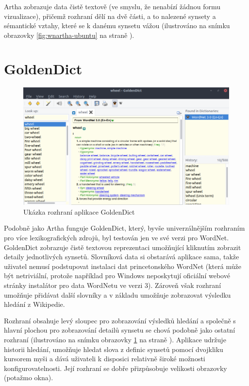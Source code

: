 \documentclass[a4paper, 11pt, oneside]{book}
\begin{document}
				Artha zobrazuje data čistě textově (ve smyslu, že nenabízí žádnou formu vizualizace), přičemž rozhraní dělí na dvě části, a to nalezené synsety a sémantické vztahy, které se k danému synsetu vážou (ilustrováno na snímku obrazovky \ref{fig:wnartha-ubuntu} na straně \pageref{fig:wnartha-ubuntu}). 

			\section{GoldenDict}
 		
 				\begin{figure}[h]
					\centering
					\includegraphics[width=1.0\textwidth]{wngoldendick-ubuntu.png}
					\caption{Ukázka rozhraní aplikace GoldenDict}
					\label{fig:wngoldendick-ubuntu}
				\end{figure}

				Podobně jako Artha funguje GoldenDict, který, byvše univerzálnějším rozhraním pro více lexikografických zdrojů, byl testován jen ve své verzi pro WordNet. GoldenDict zobrazuje čistě textovou reprezentaci umožňující kliknutím zobrazit detaily jednotlivých synsetů. Slovníková data si obstarává aplikace sama, takže uživatel nemusí podstupovat instalaci dat princetonského WordNet (která může být netriviální, protože například pro Windows neposkytují oficiální webové stránky instalátor pro data WordNetu ve verzi 3). Zároveň však rozhraní umožňuje přidávat další slovníky a v základu umožňuje zobrazovat výsledku hledání z Wikipedie. 

				Rozhraní obsahuje levý sloupec pro zobrazování výsledků hledání a společně s hlavní plochou pro zobrazování detailů synsetu se chová podobně jako ostatní rozhraní (ilustrováno na snímku obrazovky \ref{fig:wngoldendick-ubuntu} na straně \pageref{fig:wngoldendick-ubuntu}). Aplikace udržuje historii hledání, umožňuje hledat slova z definic synsetů pomocí dvojkliku kursorem myši a dává uživateli k disposici relativně široké možnosti konfigurovatelnosti. Její rozhraní se dobře přizpůsobuje velikosti obrazovky (potažmo okna).
\end{document}
